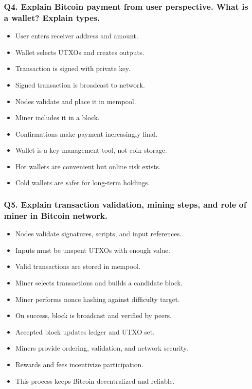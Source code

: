 \documentclass[12pt,a4paper]{article}
\begin{document}
\subsubsection*{Q4. Explain Bitcoin payment from user perspective. What is a wallet? Explain types.}
\begin{itemize}
\item User enters receiver address and amount.
\item Wallet selects UTXOs and creates outputs.
\item Transaction is signed with private key.
\item Signed transaction is broadcast to network.
\item Nodes validate and place it in mempool.
\item Miner includes it in a block.
\item Confirmations make payment increasingly final.
\item Wallet is a key-management tool, not coin storage.
\item Hot wallets are convenient but online risk exists.
\item Cold wallets are safer for long-term holdings.
\end{itemize}

\subsubsection*{Q5. Explain transaction validation, mining steps, and role of miner in Bitcoin network.}
\begin{itemize}
\item Nodes validate signatures, scripts, and input references.
\item Inputs must be unspent UTXOs with enough value.
\item Valid transactions are stored in mempool.
\item Miner selects transactions and builds a candidate block.
\item Miner performs nonce hashing against difficulty target.
\item On success, block is broadcast and verified by peers.
\item Accepted block updates ledger and UTXO set.
\item Miners provide ordering, validation, and network security.
\item Rewards and fees incentivize participation.
\item This process keeps Bitcoin decentralized and reliable.
\end{itemize}
\end{document}
